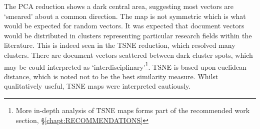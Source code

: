 %
The PCA reduction shows a dark central area, suggesting most vectors are `smeared' about a common direction. The map is not symmetric which is what would be expected for random vectors. It was expected that document vectors would be distributed in clusters representing particular research fields within the literature. This is indeed seen in the TSNE reduction, which resolved many clusters. There are document vectors scattered between dark cluster spots, which may be could interpreted as `interdisciplinary'\footnote{More in-depth analysis of TSNE maps forms part of the recommended work section, \S\ref{chapt:RECOMMENDATIONS}}.
TSNE is based upon euclidean distance, which is noted not to be the best similarity measure. Whilst qualitatively useful, TSNE maps were interpreted cautiously.
\newpage
